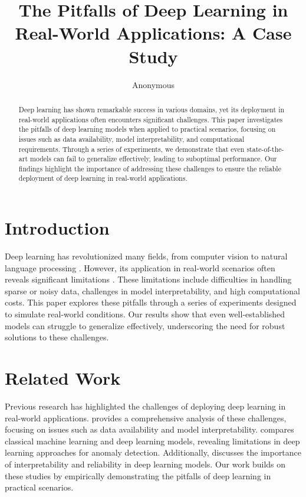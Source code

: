 \documentclass{article} %
\title{
The Pitfalls of Deep Learning in Real-World Applications: A Case Study
}
\author{Anonymous}
\theoremstyle{plain}
\theoremstyle{definition}
\theoremstyle{remark}
\begin{document}
\maketitle

\begin{abstract}
Deep learning has shown remarkable success in various domains, yet its deployment in real-world applications often encounters significant challenges. This paper investigates the pitfalls of deep learning models when applied to practical scenarios, focusing on issues such as data availability, model interpretability, and computational requirements. Through a series of experiments, we demonstrate that even state-of-the-art models can fail to generalize effectively, leading to suboptimal performance. Our findings highlight the importance of addressing these challenges to ensure the reliable deployment of deep learning in real-world applications.
\end{abstract}

\section{Introduction}
\label{sec:intro}
Deep learning has revolutionized many fields, from computer vision to natural language processing \cite{goodfellow2016deep}. However, its application in real-world scenarios often reveals significant limitations \cite{sah2023analysisod}. These limitations include difficulties in handling sparse or noisy data, challenges in model interpretability, and high computational costs. This paper explores these pitfalls through a series of experiments designed to simulate real-world conditions. Our results show that even well-established models can struggle to generalize effectively, underscoring the need for robust solutions to these challenges.

\section{Related Work}
\label{sec:related}
Previous research has highlighted the challenges of deploying deep learning in real-world applications. \cite{sah2023analysisod} provides a comprehensive analysis of these challenges, focusing on issues such as data availability and model interpretability. \cite{soares2026comparativeao} compares classical machine learning and deep learning models, revealing limitations in deep learning approaches for anomaly detection. Additionally, \cite{sahin2024unlockingtb} discusses the importance of interpretability and reliability in deep learning models. Our work builds on these studies by empirically demonstrating the pitfalls of deep learning in practical scenarios.
\end{document}
